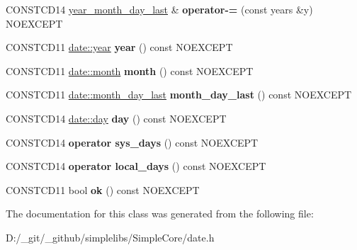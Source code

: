 \begin{DoxyCompactItemize}
\mbox{\label{classdate_1_1year__month__day__last_a63cb63ecf862fed7a984f689f21a5668}} 
C\+O\+N\+S\+T\+C\+D14 \mbox{\hyperlink{classdate_1_1year__month__day__last}{year\+\_\+month\+\_\+day\+\_\+last}} \& {\bfseries operator-\/=} (const years \&y) N\+O\+E\+X\+C\+E\+PT
\item 
\mbox{\label{classdate_1_1year__month__day__last_afa41eb8ace00d798bfae92d805f16426}} 
C\+O\+N\+S\+T\+C\+D11 \mbox{\hyperlink{classdate_1_1year}{date\+::year}} {\bfseries year} () const N\+O\+E\+X\+C\+E\+PT
\item 
\mbox{\label{classdate_1_1year__month__day__last_a3c83e2f0f75f02079313d87aaf1264a1}} 
C\+O\+N\+S\+T\+C\+D11 \mbox{\hyperlink{classdate_1_1month}{date\+::month}} {\bfseries month} () const N\+O\+E\+X\+C\+E\+PT
\item 
\mbox{\label{classdate_1_1year__month__day__last_a760ebc3c0f0578423fbf2816359e6f92}} 
C\+O\+N\+S\+T\+C\+D11 \mbox{\hyperlink{classdate_1_1month__day__last}{date\+::month\+\_\+day\+\_\+last}} {\bfseries month\+\_\+day\+\_\+last} () const N\+O\+E\+X\+C\+E\+PT
\item 
\mbox{\label{classdate_1_1year__month__day__last_a7c23ab47271432745b4014e4b32c74b6}} 
C\+O\+N\+S\+T\+C\+D14 \mbox{\hyperlink{classdate_1_1day}{date\+::day}} {\bfseries day} () const N\+O\+E\+X\+C\+E\+PT
\item 
\mbox{\label{classdate_1_1year__month__day__last_a019bce113a50e6262c56caad6ae905b8}} 
C\+O\+N\+S\+T\+C\+D14 {\bfseries operator sys\+\_\+days} () const N\+O\+E\+X\+C\+E\+PT
\item 
\mbox{\label{classdate_1_1year__month__day__last_a921d35dfdb75ffabade9586794da8ac4}} 
C\+O\+N\+S\+T\+C\+D14 {\bfseries operator local\+\_\+days} () const N\+O\+E\+X\+C\+E\+PT
\item 
\mbox{\label{classdate_1_1year__month__day__last_ab75894e7e40fda7d887455a0bcba633a}} 
C\+O\+N\+S\+T\+C\+D11 bool {\bfseries ok} () const N\+O\+E\+X\+C\+E\+PT
\end{DoxyCompactItemize}


The documentation for this class was generated from the following file\+:\begin{DoxyCompactItemize}
\item 
D\+:/\+\_\+git/\+\_\+github/simplelibs/\+Simple\+Core/date.\+h\end{DoxyCompactItemize}
